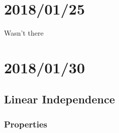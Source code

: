 \documentclass[12pt]{article}
\begin{document}
	\section{2018/01/25}
	
	Wasn't there
	
	\section{2018/01/30}	
	
	\subsection{Linear Independence}
	
	\subsubsection{Properties}
	
\end{document}
